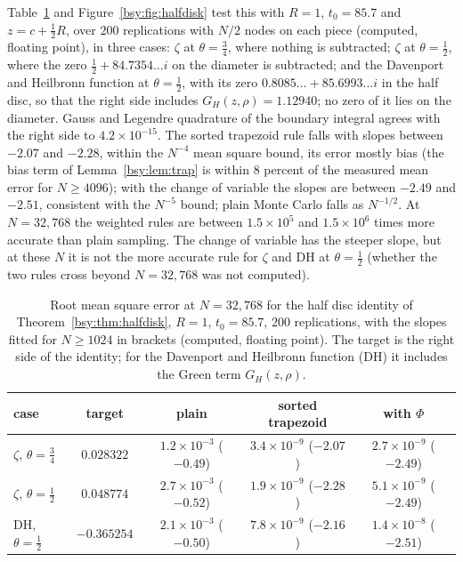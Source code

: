 Table~\ref{bsy:tab:halfdisk} and Figure~\ref{bsy:fig:halfdisk} test this with $R=1$, $t_0=85.7$ and $z=c+\frac12R$, over $200$ replications with $N/2$ nodes on each piece (computed, floating point), in three cases: $\zeta$ at $\theta=\frac34$, where nothing is subtracted; $\zeta$ at $\theta=\frac12$, where the zero $\frac12+84.7354\ldots i$ on the diameter is subtracted; and the Davenport and Heilbronn function at $\theta=\frac12$, with its zero $0.8085\ldots+85.6993\ldots i$ in the half disc, so that the right side includes $G_H(z,\rho)=1.12940$; no zero of it lies on the diameter. Gauss and Legendre quadrature of the boundary integral agrees with the right side to $4.2\times10^{-15}$. The sorted trapezoid rule falls with slopes between $-2.07$ and $-2.28$, within the $N^{-4}$ mean square bound, its error mostly bias (the bias term of Lemma~\ref{bsy:lem:trap} is within $8$ percent of the measured mean error for $N\ge4096$); with the change of variable the slopes are between $-2.49$ and $-2.51$, consistent with the $N^{-5}$ bound; plain Monte Carlo falls as $N^{-1/2}$. At $N=32{,}768$ the weighted rules are between $1.5\times10^5$ and $1.5\times10^6$ times more accurate than plain sampling. The change of variable has the steeper slope, but at these $N$ it is not the more accurate rule for $\zeta$ and DH at $\theta=\frac12$ (whether the two rules cross beyond $N=32{,}768$ was not computed).

\begin{table}[h]
\centering\scriptsize\setlength{\tabcolsep}{2pt}
\begin{tabular}{lcccc}
\toprule
case & target & plain & sorted trapezoid & with $\Phi$\\
\midrule
$\zeta$, $\theta=\frac34$ & $0.028322$ & $1.2\times10^{-3}$ ($-0.49$) & $3.4\times10^{-9}$ ($-2.07$) & $2.7\times10^{-9}$ ($-2.49$)\\
$\zeta$, $\theta=\frac12$ & $0.048774$ & $2.7\times10^{-3}$ ($-0.52$) & $1.9\times10^{-9}$ ($-2.28$) & $5.1\times10^{-9}$ ($-2.49$)\\
DH, $\theta=\frac12$ & $-0.365254$ & $2.1\times10^{-3}$ ($-0.50$) & $7.8\times10^{-9}$ ($-2.16$) & $1.4\times10^{-8}$ ($-2.51$)\\
\bottomrule
\end{tabular}
\caption{Root mean square error at $N=32{,}768$ for the half disc identity of Theorem~\ref{bsy:thm:halfdisk}, $R=1$, $t_0=85.7$, $200$ replications, with the slopes fitted for $N\ge1024$ in brackets (computed, floating point). The target is the right side of the identity; for the Davenport and Heilbronn function (DH) it includes the Green term $G_H(z,\rho)$.}\label{bsy:tab:halfdisk}
\end{table}

